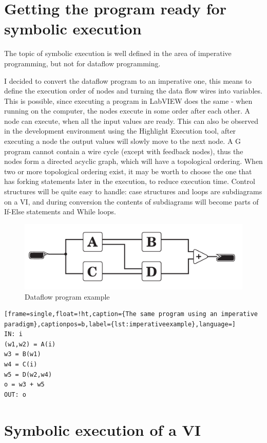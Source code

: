 \section{Getting the program ready for symbolic execution}

The topic of symbolic execution is well defined in the area of imperative programming, but not for dataflow programming.

I decided to convert the dataflow program to an imperative one, this means to define the execution order of nodes and turning the data flow wires into variables. This is possible, since executing a program in LabVIEW does the same - when running on the computer, the nodes execute in some order after each other. A node can execute, when all the input values are ready. This can also be observed in the development environment using the Highlight Execution tool, after executing a node the output values will slowly move to the next node. A G program cannot contain a wire cycle (except with feedback nodes), thus the nodes form a directed acyclic graph, which will have a topological ordering. When two or more topological ordering exist, it may be worth to choose the one that has forking statements later in the execution, to reduce execution time. Control structures will be quite easy to handle: case structures and loops are subdiagrams on a VI, and during conversion the contents of subdiagrams will become parts of If-Else statements and While loops. 
\begin{figure}
\includegraphics[width=150mm,keepaspectratio]{figures/vi1.pdf}
\caption{Dataflow program example} 
\label{fig:dataflowexample}
\end{figure}

\begin{lstlisting}[frame=single,float=!ht,caption={The same program using an imperative paradigm},captionpos=b,label={lst:imperativeexample},language=]
IN: i
(w1,w2) = A(i)
w3 = B(w1)
w4 = C(i)
w5 = D(w2,w4)
o = w3 + w5
OUT: o
\end{lstlisting}
\section{Symbolic execution of a VI}

